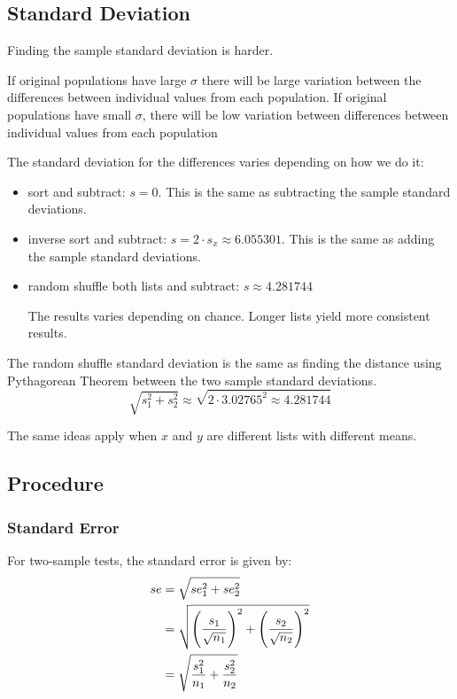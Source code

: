 \documentclass[letterpaper, landscape]{exam}
\begin{document}
  \subsection{Standard Deviation} %
  
  Finding the sample standard deviation is harder.

  If original populations have large $\sigma$ there will be large variation
  between the differences between individual values from each population. If
  original populations have small $\sigma$, there will be low variation between
  differences between individual values from each population

  The standard deviation for the differences varies depending on how we do it:
  \begin{itemize}
    \item sort and subtract: $s = 0$. This is the same as subtracting the sample
      standard deviations.

    \item inverse sort and subtract: $s = 2 \cdot s_x \approx 6.055301$. This is
      the same as adding the sample standard deviations.

    \item random shuffle both lists and subtract: $s \approx 4.281744$ 
      
      The results varies depending on chance. Longer lists yield more consistent results.

  \end{itemize}

  The random shuffle standard deviation is the same as finding the distance using Pythagorean
  Theorem between the two sample standard deviations.
  \[
    \sqrt{s_1^2 + s_2^2} \approx \sqrt{2 \cdot 3.02765^2 \approx 4.281744}
  \]

  The same ideas apply when $x$ and $y$ are different lists with different
  means.

  \subsection{Procedure} %

  \subsubsection{Standard Error} %

  For two-sample tests, the standard error is given by:
  \begin{align*}
    se &= \sqrt{ se_1^2 + se_2^2 } \\
       & = \sqrt{ \del{ \frac{s_1}{\sqrt{n_1}} }^2 + \del{ \frac{s_2}{\sqrt{n_2}} }^2 } \\
       & =  \sqrt{\frac{s_1^2}{n_1} + \frac{s_2^2}{n_2}} \\
  \end{align*}
  
\end{document}
